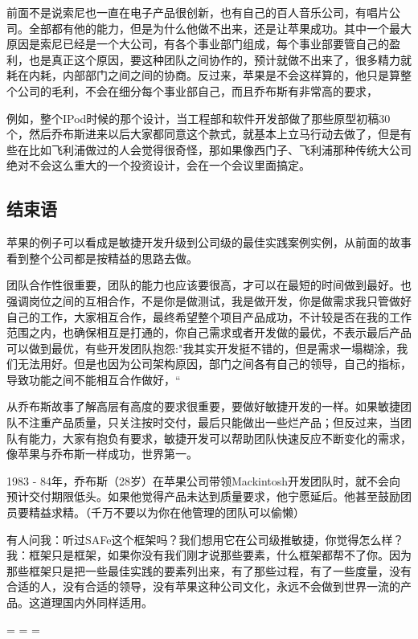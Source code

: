 前面不是说索尼也一直在电子产品很创新，也有自己的百人音乐公司，有唱片公司。全部都有他的能力，但是为什么他做不出来，还是让苹果成功。其中一个最大原因是索尼已经是一个大公司，有各个事业部门组成，每个事业部要管自己的盈利，也是真正这个原因，要这种团队之间协作的，预计就做不出来了，很多精力就耗在内耗，内部部门之间之间的协商。反过来，苹果是不会这样算的，他只是算整个公司的毛利，不会在细分每个事业部自己，而且乔布斯有非常高的要求，

例如，整个IPod时候的那个设计，当工程部和软件开发部做了那些原型初稿30个，然后乔布斯进来以后大家都同意这个款式，就基本上立马行动去做了，但是有些在比如飞利浦做过的人会觉得很奇怪，那如果像西门子、飞利浦那种传统大公司绝对不会这么重大的一个投资设计，会在一个会议里面搞定。

\hypertarget{ux7ed3ux675fux8bed}{%
\subsection{结束语}\label{ux7ed3ux675fux8bed}}

苹果的例子可以看成是敏捷开发升级到公司级的最佳实践案例实例，从前面的故事看到整个公司都是按精益的思路去做。

团队合作性很重要，团队的能力也应该要很高，才可以在最短的时间做到最好。也强调岗位之间的互相合作，不是你是做测试，我是做开发，你是做需求我只管做好自己的工作，大家相互合作，最终希望整个项目产品成功，不计较是否在我的工作范围之内，也确保相互是打通的，你自己需求或者开发做的最优，不表示最后产品可以做到最优，有些开发团队抱怨:"我其实开发挺不错的，但是需求一塌糊涂，我们无法用好。但是也因为公司架构原因，部门之间各有自己的领导，自己的指标，导致功能之间不能相互合作做好，``

从乔布斯故事了解高层有高度的要求很重要，要做好敏捷开发的一样。如果敏捷团队不注重产品质量，只关注按时交付，最后只能做出一些烂产品；但反过来，当团队有能力，大家有抱负有要求，敏捷开发可以帮助团队快速反应不断变化的需求，像苹果与乔布斯一样成功，世界第一。

1983 -
84年，乔布斯（28岁）在苹果公司带领Mackintosh开发团队时，就不会向预计交付期限低头。如果他觉得产品未达到质量要求，他宁愿延后。他甚至鼓励团员要精益求精。（千万不要以为你在他管理的团队可以偷懒）

有人问我：听过SAFe这个框架吗？我们想用它在公司级推敏捷，你觉得怎么样？
我：框架只是框架，如果你没有我们刚才说那些要素，什么框架都帮不了你。因为那些框架只是把一些最佳实践的要素列出来，有了那些过程，有了一些度量，没有合适的人，没有合适的领导，没有苹果这种公司文化，永远不会做到世界一流的产品。这道理国内外同样适用。

\begin{description}
\tightlist
\item[]
= = =
\end{description}

